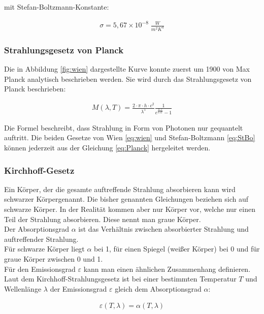 \documentclass[a4paper]{scrartcl}
\numberwithin{equation}{subsection}
\begin{document}
mit Stefan-Boltzmann-Konstante:

\begin{align*}
\sigma = 5,67 \times 10^{-8}\; \frac{W}{m^2 K^4}
\end{align*}

\subsubsection{Strahlungsgesetz von Planck}
Die in Abbildung \ref{fig:wien} dargestellte Kurve konnte zuerst um 1900 von Max Planck analytisch beschrieben werden.
Sie wird durch das Strahlungsgesetz von Planck beschrieben:

\begin{align}
\label{eq:Planck}
M(\lambda,T)=\frac{2\cdot\pi\cdot h\cdot c^2}{\lambda^5}\frac{1}{e^{\frac{h\cdot c}{k\lambda T}}-1}
\end{align}

Die Formel beschreibt, dass Strahlung in Form von Photonen nur gequantelt auftritt.
Die beiden Gesetze von Wien \ref{eq:wien} und Stefan-Boltzmann \ref{eq:StBo} können jederzeit aus der Gleichung \ref{eq:Planck} hergeleitet werden.

\subsubsection{Kirchhoff-Gesetz}
Ein Körper, der die gesamte auftreffende Strahlung absorbieren kann wird \glqq schwarzer Körper\grqq genannt.
Die bisher genannten Gleichungen beziehen sich auf schwarze Körper.
In der Realität kommen aber nur Körper vor, welche nur einen Teil der Strahlung absorbieren.
Diese nennt man \glqq graue Körper\grqq.\\
Der Absorptionsgrad $\alpha$ ist das Verhältnis zwischen absorbierter Strahlung und auftreffender Strahlung.\\
Für schwarze Körper liegt $\alpha$ bei 1, für einen Spiegel (\glqq weißer Körper\grqq) bei 0 und für graue Körper zwischen 0 und 1.\\
Für den Emissionsgrad $\varepsilon$ kann man einen ähnlichen Zusammenhang definieren.\\
Laut dem Kirchhoff-Strahlungsgesetz ist bei einer bestimmten Temperatur $T$ und Wellenlänge $\lambda$ der Emissionsgrad $\varepsilon$ gleich dem Absorptionsgrad $\alpha$:

\begin{align*}
\varepsilon(T,\lambda)=\alpha(T,\lambda)
\end{align*}
\end{document}
